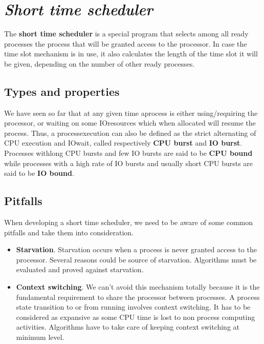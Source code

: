 \documentclass[11pt,a4paper]{scrreprt}
\begin{document}
\section{\textit{Short time scheduler}}
The \textbf{short time scheduler} is a special program that selects among all ready processes the process that will be granted access to the processor. In case the time slot mechanism is in use, it also calculates the length of the time slot it will be given, depending on the number of other ready processes.

\subsection{Types and properties}
We have seen so far that at any given time aprocess is either using/requiring the processor, or waiting on some IOresources which when allocated will resume the process. Thus, a processexecution can also be defined as the strict alternating of CPU execution and IOwait, called respectively \textbf{CPU burst} and \textbf{IO burst}. Processes withlong CPU bursts and few IO bursts are said to be \textbf{CPU bound} while processes with a high rate of IO bursts and usually short CPU bursts are said to be \textbf{IO bound}.

\subsection{Pitfalls}
When developing a short time scheduler, we need to be aware of some common pitfalls and take them into consideration.
\begin{itemize}
\item \textbf{Starvation}. Starvation occurs when a process is never granted access to the processor. Several reasons could be source of starvation. Algorithms must be evaluated and proved against starvation.
\item \textbf{Context switching}. We can’t avoid this mechanism totally because it is the fundamental requirement to share the processor between processes. A process state transition to or from running involves context switching. It has to be considered as expansive as some CPU time is lost to non process computing activities. Algorithms have to take care of keeping context switching at minimum level.
\end{itemize}
\end{document}
